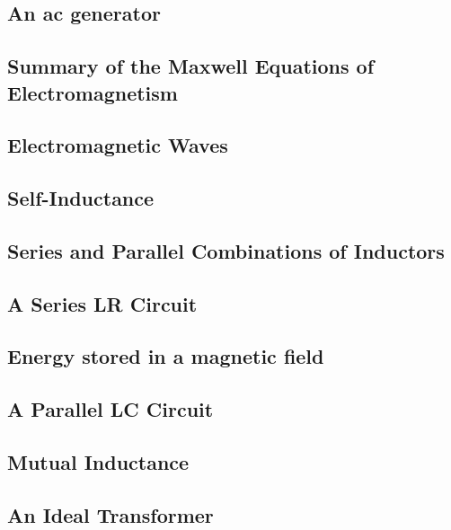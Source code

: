 \documentclass{article}
\begin{document}
\subsection{An ac generator}
\begin{outline}
	\1 
\end{outline}
\subsection{Summary of the Maxwell Equations of Electromagnetism}
\begin{outline}
	\1 
\end{outline}
\subsection{Electromagnetic Waves}
\begin{outline}
	\1 
\end{outline}
\subsection{Self-Inductance}
\begin{outline}
	\1 
\end{outline}
\subsection{Series and Parallel Combinations of Inductors}
\begin{outline}
	\1 
\end{outline}
\subsection{A Series LR Circuit}
\begin{outline}
	\1 
\end{outline}
\subsection{Energy stored in a magnetic field}
\begin{outline}
	\1 
\end{outline}
\subsection{A Parallel LC Circuit}
\begin{outline}
	\1 
\end{outline}
\subsection{Mutual Inductance}
\begin{outline}
	\1 
\end{outline}
\subsection{An Ideal Transformer}
\begin{outline}
	\1 
\end{outline}
\end{document}
